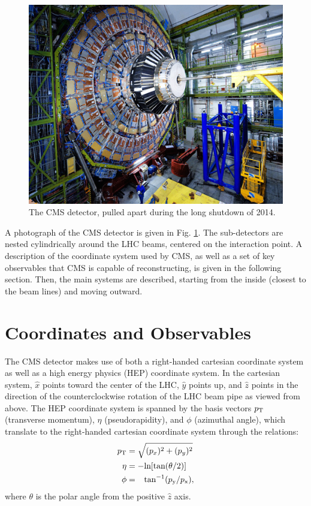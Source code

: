 \begin{figure}[h]
\centering
\includegraphics[width=0.6\linewidth]{figures/CMS/CMSBetter.jpg}
\caption{The CMS detector, pulled apart during the long shutdown of 2014. } 
\label{fig:CmsPulledApart}
\end{figure}
A photograph of the CMS detector is given in Fig. \ref{fig:CmsPulledApart}. The sub-detectors are nested cylindrically around the LHC beams, centered on the interaction point. A description of the coordinate system used by CMS, as well as a set of key observables that CMS is capable of reconstructing, is given in the following section. Then, the main systems are described, starting from the inside (closest to the beam lines) and moving outward.

\section{Coordinates and Observables}
The CMS detector makes use of both a right-handed cartesian coordinate system as well as a high energy physics (HEP) coordinate system. In the cartesian system, $\hat{x}$ points toward the center of the LHC, $\hat{y}$ points up, and $\hat{z}$ points in the direction of the counterclockwise rotation of the LHC beam pipe as viewed from above. The HEP coordinate system is spanned by the basis vectors $p_{\text{T}}$ (transverse momentum), $\eta$ (pseudorapidity), and $\phi$ (azimuthal angle), which translate to the right-handed cartesian coordinate system through the relations:
\begin{align}
p_{\text{T}} &= \sqrt{(p_{x})^2+(p_{y})^2}\\
\eta &= -\text{ln}[\text{tan}(\theta/2)]\\
\phi &= \hphantom{-}\text{tan}^{-1}(p_{\text{y}}/p_{\text{x}}),
\end{align}
where $\theta$ is the polar angle from the positive $\hat{z}$ axis.

